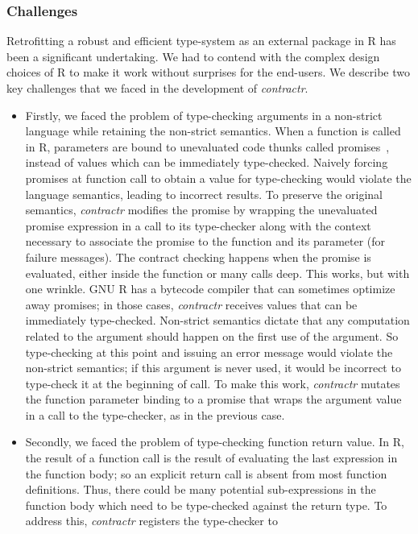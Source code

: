 \documentclass[acmsmall,review,anonymous]{acmart}\settopmatter{printfolios=true,printccs=false,printacmref=false}
\newcommand{\contractr}{\emph{contractr}\xspace} %
\begin{document}
\subsubsection{Challenges}
Retrofitting a robust and efficient type-system as an external package in R has
been a significant undertaking. We had to contend with the complex design
choices of R to make it work without surprises for the end-users. We describe
two key challenges that we faced in the development of \contractr.
\begin{itemize}
\item Firstly, we faced the problem of type-checking arguments in a
  non-strict language while retaining the non-strict semantics. When a
  function is called in R, parameters are bound to unevaluated code thunks
  called promises~\cite{oopsla19}, instead of values which can be
  immediately type-checked. Naively forcing promises at function call to
  obtain a value for type-checking would violate the language semantics,
  leading to incorrect results. To preserve the original semantics,
  \contractr modifies the promise by wrapping the unevaluated promise
  expression in a call to its type-checker along with the context necessary
  to associate the promise to the function and its parameter (for failure
  messages). The contract checking happens when the promise is evaluated,
  either inside the function or many calls deep.  This works, but with one
  wrinkle. GNU R has a bytecode compiler that can sometimes optimize away
  promises; in those cases, \contractr receives values that can be
  immediately type-checked. Non-strict semantics dictate that any
  computation related to the argument should happen on the first use of the
  argument. So type-checking at this point and issuing an error message
  would violate the non-strict semantics; if this argument is never used, it
  would be incorrect to type-check it at the beginning of call. To make this
  work, \contractr mutates the function parameter binding to a promise that
  wraps the argument value in a call to the type-checker, as in the previous
  case.
\item Secondly, we faced the problem of type-checking function return
  value. In R, the result of a function call is the result of evaluating the
  last expression in the function body; so an explicit return call is absent
  from most function definitions. Thus, there could be many potential
  sub-expressions in the function body which need to be type-checked against
  the return type. To address this, \contractr registers the type-checker to

\end{itemize}
\end{document}
